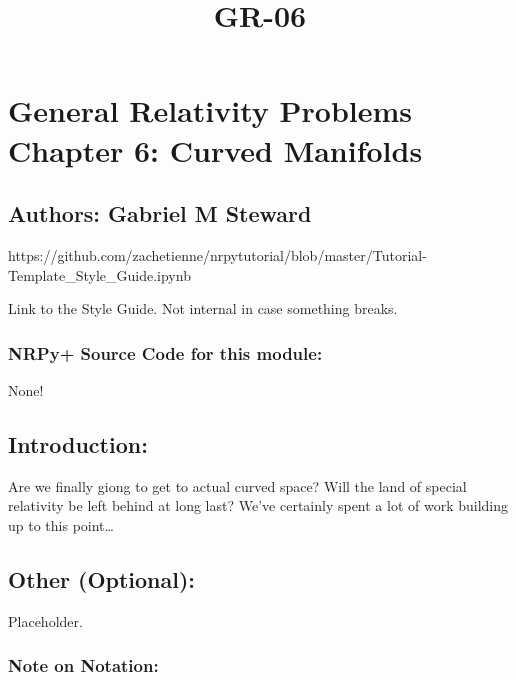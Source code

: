 \documentclass[landscape,letterpaper,10pt,english]{article}
\title{GR-06}
\begin{document}
    
    \maketitle
    
    

    
    \hypertarget{general-relativity-problems-chapter-6-curved-manifolds}{%
\section{General Relativity Problems Chapter 6: Curved
Manifolds}\label{general-relativity-problems-chapter-6-curved-manifolds}}

\hypertarget{authors-gabriel-m-steward}{%
\subsection{Authors: Gabriel M
Steward}\label{authors-gabriel-m-steward}}

    https://github.com/zachetienne/nrpytutorial/blob/master/Tutorial-Template\_Style\_Guide.ipynb

Link to the Style Guide. Not internal in case something breaks.

    \hypertarget{nrpy-source-code-for-this-module}{%
\subsubsection{\texorpdfstring{ NRPy+ Source Code for this
module:}{ NRPy+ Source Code for this module:}}\label{nrpy-source-code-for-this-module}}

None!

\hypertarget{introduction}{%
\subsection{Introduction:}\label{introduction}}

Are we finally giong to get to actual curved space? Will the land of
special relativity be left behind at long last? We've certainly spent a
lot of work building up to this point\ldots{}

\hypertarget{other-optional}{%
\subsection{\texorpdfstring{ Other
(Optional):}{ Other (Optional):}}\label{other-optional}}

Placeholder.

\hypertarget{note-on-notation}{%
\subsubsection{Note on Notation:}\label{note-on-notation}}
\end{document}
